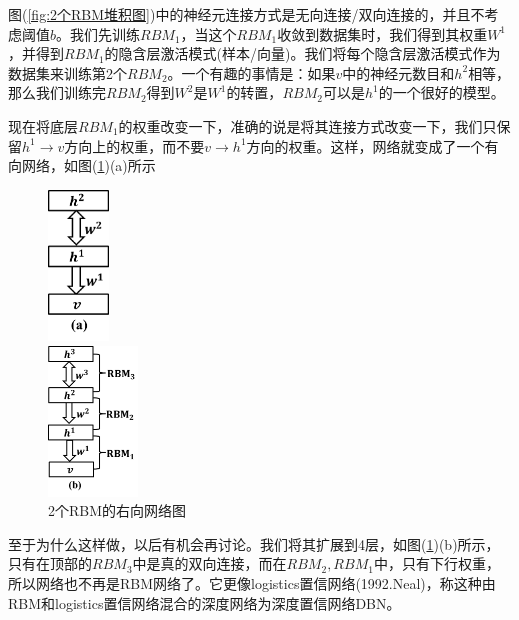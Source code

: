         图(\ref{fig:2个RBM堆积图})中的神经元连接方式是无向连接/双向连接的，并且不考虑阈值$b$。我们先训练$RBM_1$，当这个$RBM_1$收敛到数据集时，我们得到其权重$W^1$，并得到$RBM_1$的隐含层激活模式(样本/向量)。我们将每个隐含层激活模式作为数据集来训练第2个$RBM_2$。一个有趣的事情是：如果$v$中的神经元数目和$h^2$相等，那么我们训练完$RBM_2$得到$W^2$是$W^1$的转置，$RBM_2$可以是$h^1$的一个很好的模型。
        \par
        现在将底层$RBM_1$的权重改变一下，准确的说是将其连接方式改变一下，我们只保留$h^1\rightarrow v$方向上的权重，而不要$v\to h^1$方向的权重。这样，网络就变成了一个有向网络，如图(\ref{fig:2个RBM的右向网络图})(a)所示
\begin{figure}[H]
  \centering
  \begin{varwidth}[t]{\textwidth}
    \vspace{0pt}
    \includegraphics[height=4cm]{images/2RBM_right_net1.jpg}
  \end{varwidth}
  \qquad\qquad
  \begin{varwidth}[t]{\textwidth}
    \vspace{0pt}
    \includegraphics[height=4cm]{images/2RBM_right_net2.jpg}
  \end{varwidth}
  \caption{2个RBM的右向网络图}
  \label{fig:2个RBM的右向网络图}
\end{figure}
        至于为什么这样做，以后有机会再讨论。我们将其扩展到4层，如图(\ref{fig:2个RBM的右向网络图})(b)所示，只有在顶部的$RBM_3$中是真的双向连接，而在$RBM_2,RBM_1$中，只有下行权重，所以网络也不再是RBM网络了。它更像logistics置信网络(1992.Neal)，称这种由RBM和logistics置信网络混合的深度网络为深度置信网络DBN。
